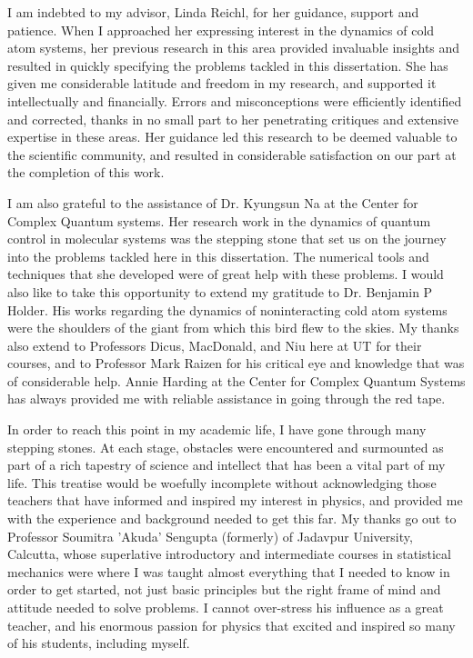 \documentclass[12pt]{report}	%
\theoremstyle{definition}
\theoremstyle{remark}
\begin{document}
\begin{acknowledgments}		%
%
I am indebted to my advisor, Linda Reichl, for her guidance, support and patience. When I approached her expressing interest in the dynamics of cold atom systems, her previous research in this area provided invaluable insights and resulted in quickly specifying the problems tackled in this dissertation. She has given me considerable latitude and freedom in my research, and supported it intellectually and financially. Errors and misconceptions were efficiently identified and corrected, thanks in no small part to her penetrating critiques and extensive expertise in these areas. Her guidance led this research to be deemed valuable to the scientific community, and resulted in considerable satisfaction on our part at the completion of this work.

I am also grateful to the assistance of Dr. Kyungsun Na at the Center for Complex Quantum systems. Her research work in the dynamics of quantum control in molecular systems was the stepping stone that set us on the journey into the problems tackled here in this dissertation. The numerical tools and techniques that she developed were of great help with these problems. I would also like to take this opportunity to extend my gratitude to Dr. Benjamin P Holder. His works regarding the dynamics of noninteracting cold atom systems were the shoulders of the giant from which this bird flew to the skies. My thanks also extend to Professors Dicus, MacDonald, and Niu here at UT for their courses, and to Professor Mark Raizen for his critical eye and knowledge that was of considerable help. Annie Harding at the Center for Complex Quantum Systems has always provided me with reliable assistance in going through the red tape.

In order to reach this point in my academic life, I have gone through many stepping stones. At each stage, obstacles were encountered and surmounted as part of a rich tapestry of science and intellect that has been a vital part of my life. This treatise would be woefully incomplete without acknowledging those teachers that have informed and inspired my interest in physics, and provided me with the experience and background needed to get this far. My thanks go out to Professor Soumitra 'Akuda' Sengupta (formerly) of Jadavpur University, Calcutta, whose superlative introductory and intermediate courses in statistical mechanics were where I was taught almost everything that I needed to know in order to get started, not just basic principles but the right frame of mind and attitude needed to solve problems. I cannot over-stress his influence as a great teacher, and his enormous passion for physics that excited and inspired so many of his students, including myself. 


\end{acknowledgments}
\end{document}
